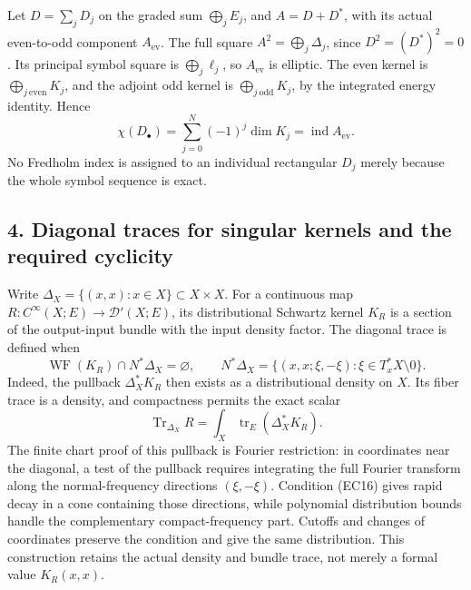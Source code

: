 \documentclass[
  11pt,
]{article}
\begin{document}
Let \(D=\sum_j D_j\) on the graded sum \(\bigoplus_j E_j\), and
\(A=D+D^*\), with its actual even-to-odd component \(A_{\mathrm{ev}}\).
The full square \(A^2=\bigoplus_j\Delta_j\), since \(D^2=(D^*)^2=0\).
Its principal symbol square is \(\bigoplus_j\ell_j\), so
\(A_{\mathrm{ev}}\) is elliptic. The even kernel is
\(\bigoplus_{j\ \mathrm{even}}K_j\), and the adjoint odd kernel is
\(\bigoplus_{j\ \mathrm{odd}}K_j\), by the integrated energy identity.
Hence \[
 \chi(D_\bullet)=\sum_{j=0}^N(-1)^j\dim K_j
     =\operatorname{ind}A_{\mathrm{ev}}.
 \tag{EC15}
\] No Fredholm index is assigned to an individual rectangular \(D_j\)
merely because the whole symbol sequence is exact.

\subsection{4. Diagonal traces for singular kernels and the required
cyclicity}\label{diagonal-traces-for-singular-kernels-and-the-required-cyclicity}

Write \(\Delta_X=\{(x,x):x\in X\}\subset X\times X\). For a continuous
map \(R:C^\infty(X;E)\to\mathcal D'(X;E)\), its distributional Schwartz
kernel \(K_R\) is a section of the output-input bundle with the input
density factor. The diagonal trace is defined when \[
 \operatorname{WF}(K_R)\cap
 N^*\Delta_X=\varnothing,\qquad
 N^*\Delta_X
 =\{(x,x;\xi,-\xi):\xi\in T_x^*X\setminus0\}.
 \tag{EC16}
\] Indeed, the pullback \(\Delta_X^*K_R\) then exists as a
distributional density on \(X\). Its fiber trace is a density, and
compactness permits the exact scalar \[
 \operatorname{Tr}_{\Delta_X}R
    =\int_X\operatorname{tr}_E(\Delta_X^*K_R).
 \tag{EC17}
\] The finite chart proof of this pullback is Fourier restriction: in
coordinates near the diagonal, a test of the pullback requires
integrating the full Fourier transform along the normal-frequency
directions \((\xi,-\xi)\). Condition (EC16) gives rapid decay in a cone
containing those directions, while polynomial distribution bounds handle
the complementary compact-frequency part. Cutoffs and changes of
coordinates preserve the condition and give the same distribution. This
construction retains the actual density and bundle trace, not merely a
formal value \(K_R(x,x)\).
\end{document}
